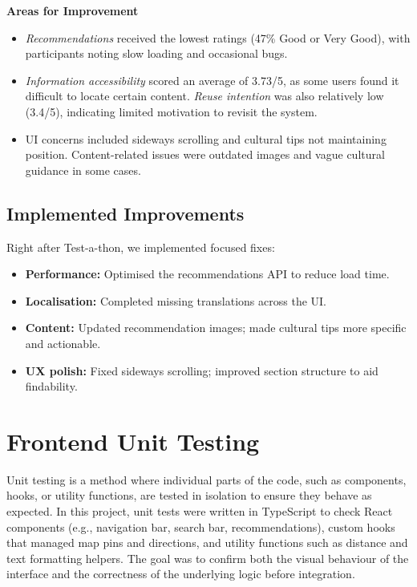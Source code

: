 \textbf{Areas for Improvement}
\begin{itemize}\setlength\itemsep{0.3em}
    \item \emph{Recommendations} received the lowest ratings (47\% Good or Very Good), with participants noting slow loading and occasional bugs. 
    \item \emph{Information accessibility} scored an average of 3.73/5, as some users found it difficult to locate certain content. \emph{Reuse intention} was also relatively low (3.4/5), indicating limited motivation to revisit the system. 
    \item UI concerns included sideways scrolling and cultural tips not maintaining position. Content-related issues were outdated images and vague cultural guidance in some cases. 
\end{itemize}


\subsection{Implemented Improvements}

\noindent Right after Test-a-thon, we implemented focused fixes:
\begin{itemize}\setlength\itemsep{0.2em}
  \item \textbf{Performance:} Optimised the recommendations API to reduce load time. 
  \item \textbf{Localisation:} Completed missing translations across the UI. 
  \item \textbf{Content:} Updated recommendation images; made cultural tips more specific and actionable. 
  \item \textbf{UX polish:} Fixed sideways scrolling; improved section structure to aid findability. 
\end{itemize}


\cleardoublepage
\section{Frontend Unit Testing}
\label{sec:fe-unit-tests}

Unit testing is a method where individual parts of the code, such as components, hooks, or utility functions, 
are tested in isolation to ensure they behave as expected. 
In this project, unit tests were written in TypeScript to check React components (e.g., navigation bar, search bar, recommendations), 
custom hooks that managed map pins and directions, and utility functions such as distance and text formatting helpers. 
The goal was to confirm both the visual behaviour of the interface and the correctness of the underlying logic before integration.


